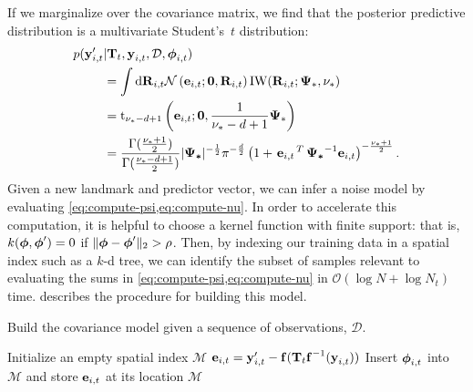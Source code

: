 If we marginalize over the covariance matrix, we find that the posterior
predictive distribution is a multivariate Student's~$t$ distribution:
\begin{align}
p(\boldsymbol{\mathbf{y}}_{i, t}'&|  \boldsymbol{\mathbf{T}}_t,\boldsymbol{\mathbf{y}}_{i, t}, \mathcal{D},
  \boldsymbol{\mathbf{\phi}}_{i,t}) \\ &= \int \mathrm{d}\boldsymbol{\mathbf{R}}_{i,t}
  \mathcal{N}\left( \boldsymbol{\mathbf{e}}_{i,t}; \boldsymbol{\mathbf{0}},
    \boldsymbol{\mathbf{R}}_{i,t}\right)
  \text{IW}(\boldsymbol{\mathbf{R}}_{i,t};\boldsymbol{\mathbf{\Psi}}_*, \nu_*)  \\ &=
  \text{t}_{\nu_*-d+1}\left(
    \boldsymbol{\mathbf{e}}_{i,t}; \boldsymbol{\mathbf{0}}, \frac{1}{\nu_*-d+1}\boldsymbol{\mathbf{\Psi}}_*\right) \\ &=
    \frac{\Gamma(\frac{\nu_*+1}{2})}{\Gamma(\frac{\nu_*-d+1}{2})}
    \vert\boldsymbol{\mathbf{\Psi_*}}\vert^{-\frac{1}{2}}\pi^{-\frac{d}{2}} \left(1+
    \left.{\boldsymbol{\mathbf{e}}_{i,t}}\right.^T \boldsymbol{\mathbf{\Psi_*}}^{-1} \boldsymbol{\mathbf{e}}_{i,t}
  \right)^{-\frac{\nu_*+1}{2}}. 
\end{align}
Given a new landmark and predictor vector, we can infer a noise model by
evaluating \cref{eq:compute-psi,eq:compute-nu}.  In order to accelerate this
computation, it is helpful to choose a kernel function with finite support:
that is, $k(\boldsymbol{\mathbf{\phi}},\boldsymbol{\mathbf{\phi}}')=0$ if $\Vert\boldsymbol{\mathbf{\phi}} -
\boldsymbol{\mathbf{\phi}}'\Vert_2 > \rho$. Then, by indexing our training data in a spatial
index such as a $k$-d tree, we can identify the subset of samples relevant to
evaluating the sums in \cref{eq:compute-psi,eq:compute-nu} in $\mathcal{O}(\log
N + \log N_t)$ time.   describes the procedure for
building this model. 

\begin{algorithm}
  \caption{Build the covariance model given a sequence of observations, $\mathcal{D}$.}
  \label{alg:train-ground-truth}
  \begin{algorithmic}
      \State Initialize an empty spatial index $\mathcal{M}$
          \State $\boldsymbol{\mathbf{e}}_{i,t} = \boldsymbol{\mathbf{y}}_{i, t}' -
            \boldsymbol{\mathbf{f}}( \boldsymbol{\mathbf{T}}_t \boldsymbol{\mathbf{f}}^{-1}(
            \boldsymbol{\mathbf{y}}_{i, t} ))$
            \State Insert $\boldsymbol{\mathbf{\phi}}_{i,t}$ into $\mathcal{M}$ and store
              $\boldsymbol{\mathbf{e}}_{i,t}$ at its location
        \EndFor
      \EndFor
      \State\Return $\mathcal{M}$
    \EndFunction
  \end{algorithmic}
\end{algorithm}


